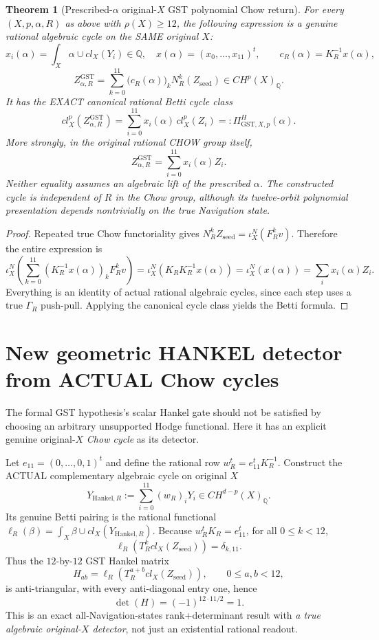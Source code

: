 \documentclass[11pt]{article}
\newtheorem{theorem}{Theorem}
\begin{document}
\begin{theorem}[Prescribed-$\alpha$ original-$X$ GST polynomial Chow return]
For every $(X,p,\alpha,R)$ as above with $\rho(X)\ge12$,
the following expression is a \emph{genuine} rational
algebraic cycle on the SAME original $X$:
\[
x_i(\alpha)=\int_X \alpha\cup cl_X(Y_i)\in\mathbb Q,\quad
x(\alpha)=(x_0,\ldots,x_{11})^t,\qquad
c_R(\alpha)=K_R^{-1}x(\alpha),
\]
\[
\boxed{
Z_{\alpha,R}^{\mathrm{GST}}=
\sum_{k=0}^{11}\bigl(c_R(\alpha)\bigr)_k
     N_R^k(Z_{\mathrm{seed}})
\in CH^p(X)_\mathbb Q.
}
\]
It has the EXACT canonical rational Betti cycle class
\[
\boxed{
cl_X^p(Z_{\alpha,R}^{\mathrm{GST}})
=\sum_{i=0}^{11}x_i(\alpha)\,cl_X^p(Z_i)
=:\Pi_{\mathrm{GST},X,p}^H(\alpha).
}
\]
More strongly, in the original rational CHOW group itself,
\[
Z_{\alpha,R}^{\mathrm{GST}}
=\sum_{i=0}^{11}x_i(\alpha)Z_i.
\]
Neither equality assumes an algebraic lift of the
prescribed $\alpha$. The constructed cycle is independent
of $R$ in the Chow group, although its twelve-orbit
polynomial presentation depends nontrivially on the
true Navigation state.
\end{theorem}

\begin{proof}
Repeated true Chow functoriality gives
$N_R^kZ_{\mathrm{seed}}=
\iota_X^N(F_R^k v)$.
Therefore the entire expression is
\[
\iota_X^N\left(
\sum_{k=0}^{11}(K_R^{-1}x(\alpha))_k F_R^k v
\right)
=\iota_X^N(K_R K_R^{-1}x(\alpha))
=\iota_X^N(x(\alpha))
=\sum_i x_i(\alpha)Z_i.
\]
Everything is an identity of actual rational algebraic
cycles, since each step uses a true $\Gamma_R$ push-pull.
Applying the canonical cycle class yields the Betti formula.
\end{proof}

\section{New geometric HANKEL detector from ACTUAL Chow cycles}

The formal GST hypothesis's scalar Hankel gate should
not be satisfied by choosing an arbitrary unsupported
Hodge functional. Here it has an explicit genuine
original-$X$ \emph{Chow cycle} as its detector.

Let $e_{11}=(0,\ldots,0,1)^t$ and define the rational
row $w_R^t=e_{11}^t K_R^{-1}$. Construct the ACTUAL
complementary algebraic cycle on original $X$
\[
\boxed{
Y_{\mathrm{Hankel},R}:=\sum_{i=0}^{11}
(w_R)_i Y_i\in CH^{d-p}(X)_\mathbb Q.
}
\]
Its genuine Betti pairing is the rational functional
$\ell_R(\beta)=\int_X\beta\cup cl_X(Y_{\mathrm{Hankel},R})$.
Because $w_R^t K_R=e_{11}^t$, for all $0\le k<12$,
\[
\ell_R(T_R^k cl_X(Z_{\mathrm{seed}}))
=\delta_{k,11}.
\]
Thus the $12$-by-$12$ GST Hankel matrix
\[
H_{ab}=\ell_R(T_R^{a+b}cl_X(Z_{\mathrm{seed}})),
\qquad 0\le a,b<12,
\]
is anti-triangular, with every anti-diagonal entry one,
hence
\[
\boxed{\det(H)=(-1)^{12\cdot11/2}=1.}
\]
This is an exact all-Navigation-states rank+determinant
result with \emph{a true algebraic original-$X$ detector},
not just an existential rational readout.
\end{document}
